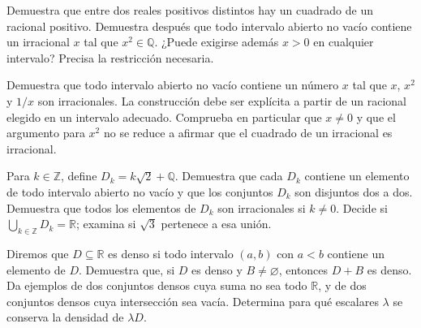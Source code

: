 \begin{samepage}
\begin{problem}\label{prob:reto-densidad-02}
Demuestra que entre dos reales positivos distintos hay un cuadrado de un racional positivo. Demuestra después que todo intervalo abierto no vacío contiene un irracional $x$ tal que $x^2\in\mathbb Q$. ¿Puede exigirse además $x>0$ en cualquier intervalo? Precisa la restricción necesaria.~\cite{mseDensidadCuadrados}
\end{problem}
\end{samepage}
\par{}

\begin{samepage}
\begin{problem}\label{prob:reto-densidad-03}
Demuestra que todo intervalo abierto no vacío contiene un número $x$ tal que $x$, $x^2$ y $1/x$ son irracionales. La construcción debe ser explícita a partir de un racional elegido en un intervalo adecuado. Comprueba en particular que $x\ne0$ y que el argumento para $x^2$ no se reduce a afirmar que el cuadrado de un irracional es irracional.
\end{problem}
\end{samepage}
\par{}

\begin{samepage}
\begin{problem}\label{prob:reto-densidad-04}
Para $k\in\mathbb Z$, define $D_k=k\sqrt2+\mathbb Q$. Demuestra que cada $D_k$ contiene un elemento de todo intervalo abierto no vacío y que los conjuntos $D_k$ son disjuntos dos a dos. Demuestra que todos los elementos de $D_k$ son irracionales si $k\ne0$. Decide si $\bigcup_{k\in\mathbb Z}D_k=\mathbb R$; examina si $\sqrt3$ pertenece a esa unión.
\end{problem}
\end{samepage}
\par{}

\begin{samepage}
\begin{problem}\label{prob:reto-densidad-05}
Diremos que $D\subseteq\mathbb R$ es denso si todo intervalo $(a,b)$ con $a<b$ contiene un elemento de $D$. Demuestra que, si $D$ es denso y $B\ne\varnothing$, entonces $D+B$ es denso. Da ejemplos de dos conjuntos densos cuya suma no sea todo $\mathbb R$, y de dos conjuntos densos cuya intersección sea vacía. Determina para qué escalares $\lambda$ se conserva la densidad de $\lambda D$.
\end{problem}
\end{samepage}
\par{}

